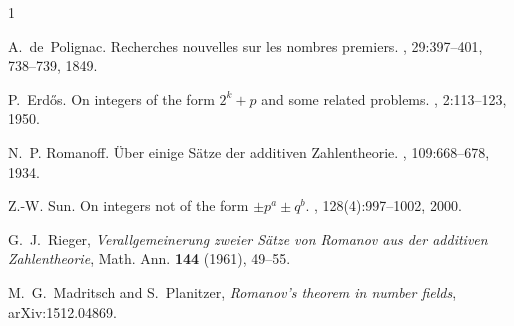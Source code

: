 \documentclass[11pt]{article}
\begin{document}
\begin{thebibliography}{1}

A.~de~Polignac.
\newblock Recherches nouvelles sur les nombres premiers.
, 29:397--401, 738--739, 1849.

P.~Erd\H{o}s.
\newblock On integers of the form $2^k+p$ and some related problems.
, 2:113--123, 1950.

N.~P. Romanoff.
\newblock \"Uber einige S\"atze der additiven Zahlentheorie.
, 109:668--678, 1934.

Z.-W. Sun.
\newblock On integers not of the form $\pm  p^a\pm q^b$.
,
  128(4):997--1002, 2000.
  
G.~J.~Rieger,
\emph{Verallgemeinerung zweier S\"atze von Romanov aus der additiven Zahlentheorie},
Math. Ann. \textbf{144} (1961), 49--55.

M.~G.~Madritsch and S.~Planitzer,
\emph{Romanov's theorem in number fields},
arXiv:1512.04869.
\end{thebibliography}
\end{document}
